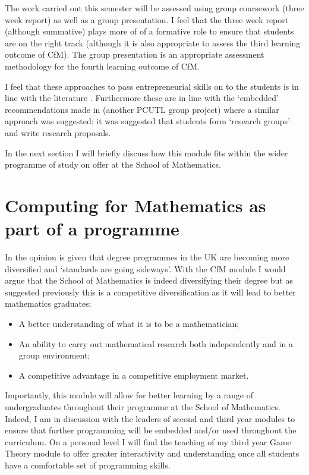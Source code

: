 \documentclass{article}
\begin{document}
The work carried out this semester will be assessed using group coursework (three week report) as well as a group presentation. I feel that the three week report (although summative) plays more of of a formative role to ensure that students are on the right track (although it is also appropriate to assess the third learning outcome of CfM). The group presentation is an appropriate assessment methodology for the fourth learning outcome of CfM.

I feel that these approaches to pass entrepreneurial skills on to the students is in line with the literature \cite{solomon_examination_2007}. Furthermore these are in line with the `embedded' recommendations made in \cite{evas_embedding_2013} (another PCUTL group project) where a similar approach was suggested: it was suggested that students form `research groups' and write research proposals.

In the next section I will briefly discuss how this module fits within the wider programme of study on offer at the School of Mathematics.

\section{Computing for Mathematics as part of a programme}

In \cite{elton_are_1998} the opinion is given that degree programmes in the UK are becoming more diversified and `standards are going sideways'. With the CfM module I would argue that the School of Mathematics is indeed diversifying their degree but as suggested previously this is a competitive diversification as it will lead to better mathematics graduates:

\begin{itemize}
\item A better understanding of what it is to be a mathematician;
\item An ability to carry out mathematical research both independently and in a group environment;
\item A competitive advantage in a competitive employment market.
\end{itemize}

Importantly, this module will allow for better learning by a range of undergraduates throughout their programme at the School of Mathematics. Indeed, I am in discussion with the leaders of second and third year modules to ensure that further programming will be embedded and/or used throughout the curriculum. On a personal level I will find the teaching of my third year Game Theory module to offer greater interactivity and understanding once all students have a comfortable set of programming skills.
\end{document}
